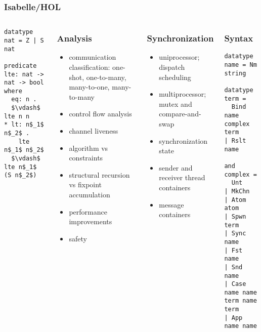 \documentclass{beamer}
\begin{document}
\begin{frame}[fragile]
	\frametitle{Isabelle/HOL}
\begin{columns}
\begin{column}{0.5\textwidth}
\begin{lstlisting}[language=logic, mathescape]
datatype nat = Z | S nat

predicate lte: nat -> nat -> bool where
  eq: n . 
  $\vdash$ lte n n
* lt: n$_1$ n$_2$ . 
    lte n$_1$ n$_2$ 
  $\vdash$ lte n$_1$ (S n$_2$)
\end{lstlisting}
\end{column}


\begin{frame}
\frametitle{Analysis}
\begin{itemize}
\item communication classification: one-shot, one-to-many, many-to-one, many-to-many
\item control flow analysis
\item channel liveness
\item algorithm vs constraints
\item structural recursion vs fixpoint accumulation
\item performance improvements
\item safety
\end{itemize}
\end{frame}


\begin{frame}
\frametitle{Synchronization}
\begin{itemize}
\item uniprocessor; dispatch scheduling
\item multiprocessor; mutex and compare-and-swap
\item synchronization state
\item sender and receiver thread containers
\item message containers
\end{itemize}
\end{frame}



\begin{frame}[fragile]
	\frametitle{Syntax}
\begin{lstlisting}[language=logic, mathescape]
datatype name = Nm string

datatype term = 
  Bind name complex term 
| Rslt name

and complex = 
  Unt
| MkChn
| Atom atom
| Spwn term 
| Sync name
| Fst name
| Snd name
| Case name name term name term 
| App name name


\end{lstlisting}
\end{frame}
\end{columns}
\end{frame}
\end{document}
